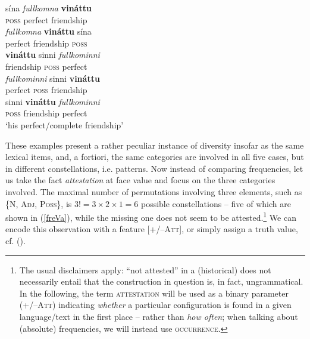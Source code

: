 \documentclass[output=paper,colorlinks,citecolor=brown,draft]{langscibook}
\begin{document}
\begin{exe}
  \ex  \label{freVa}  
    \begin{xlist}
      \ex  \gll  sína  \textit{fullkomna} \textbf{vináttu}  \\ 
       \textsc{poss} perfect friendship  \\         
      \ex    \gll    \textit{fullkomna} \textbf{vináttu} sína \\  
        perfect friendship \textsc{poss}  \\     
      \ex  \gll   \textbf{vináttu} sinni  \textit{fullkominni} \\ 
        friendship \textsc{poss} perfect    \\   
      \ex   \gll    \textit{fullkominni} sinni  \textbf{vináttu} \\ 
        perfect \textsc{poss} friendship   \\         
      \ex  \gll   sinni \textbf{vináttu}  \textit{fullkominni}\footnotemark{} \\ 
        \textsc{poss} friendship perfect    \\   
        \glt  `his perfect/complete friendship'
    \end{xlist}  
    
\end{exe}


These examples present a rather peculiar instance of diversity  insofar as the same lexical items, and,  a fortiori, the same categories are involved in all five cases, but in different constellations, i.e.  patterns. Now instead of comparing frequencies, 
let us take the fact \textit{attestation} at face value and focus on the three categories involved.  The maximal number of permutations involving three elements, such as {\small\scshape\{N, Adj, Poss\}},  is $3! = 3 \times 2 \times 1 = 6$  possible constellations  -- five of which are shown in (\ref{freVa}), while the missing one does not seem to be attested.\footnote{The usual disclaimers apply: ``not attested'' in a (historical)  does not necessarily entail that the construction in question is, in fact, ungrammatical. \\ \indent
 In the following, the term \textsc{attestation} will be used  as a binary parameter (+/--\textsc{Att}) indicating \textit{whether} a particular configuration is found in a given language/text in the first place -- rather than \textit{how often}; when talking about (absolute) frequencies, we will instead use \textsc{occurrence}.     } 
We can encode this observation with a feature [+/--\textsc{Att}], or simply assign a truth value, cf. ().
\end{document}
